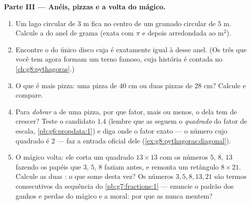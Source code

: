 \begin{problem}[{Problema de fim de semana --- uma ``demonstração''
famosa de que $64 = 65$, desmascarada por áreas e inclinações, com
pizzas e anéis de sobremesa}]
\medskip
\noindent\textbf{Parte III --- Anéis, pizzas e a volta do mágico.}
\begin{enumerate}[resume]
  \item Um lago circular de  $3$ m fica no centro de um gramado
        circular de  $5$ m. Calcule a  do anel de grama (exata
        com $\pi$ e depois arredondada ao m$^2$).
  \item Encontre o  do único disco cuja  é exatamente igual à
        desse anel. (Os três  que você tem agora formam um terno
        famoso, cuja história é contada no
        \cref{ch:g8:pythagoras}.)
  \item O que é mais pizza: uma pizza de  $40$ cm ou duas
        pizzas de  $28$ cm? Calcule e compare.
  \item Para \emph{dobrar} a  de uma pizza, por que fator, mais ou
        menos, o  dela tem de crescer? Teste o candidato $1.4$
        (lembre que as  seguem o \emph{quadrado} do fator de
        escala, \cref{pb:g6:propdata:1}) e diga onde o fator exato ---
        o número cujo quadrado é $2$ --- faz a entrada oficial dele
        (\cref{ex:g8:pythagoras:diagonal}).
  \item O mágico volta: ele corta um quadrado $13 \times 13$ com os
        números $5$, $8$, $13$ fazendo os papéis que $3$, $5$, $8$
        faziam antes, e remonta um retângulo $8 \times 21$. Calcule as
        duas : o que some desta vez? Os números $3, 5, 8, 13, 21$
        são termos consecutivos da sequência do
        \cref{pb:g7:fractions:1} --- enuncie o padrão dos ganhos e
        perdas do mágico e a moral: por que as  nunca mentem?
\end{enumerate}
\end{problem}
